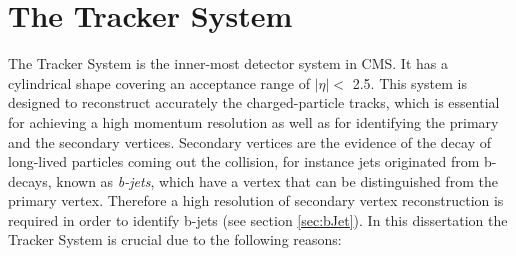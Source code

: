 

\section{The Tracker System}
\label{sec:Tracker}

\noindent The Tracker System is the inner-most detector system in CMS. It has 
a cylindrical shape covering an acceptance range of $|\eta| < $ 2.5. This system is 
designed to reconstruct accurately the charged-particle tracks, which is essential 
for achieving a high momentum resolution as well as for identifying the primary and the 
secondary vertices. Secondary vertices are the evidence of the decay 
of long-lived particles coming out the collision, for instance 
jets originated from b-decays, known as \textit{b-jets}, which have a vertex 
that can be distinguished from the primary vertex. Therefore 
a high resolution of secondary vertex reconstruction is required in order to 
identify b-jets (see section \ref{sec:bJet}). In this dissertation the 
Tracker System is crucial due to the following reasons:


